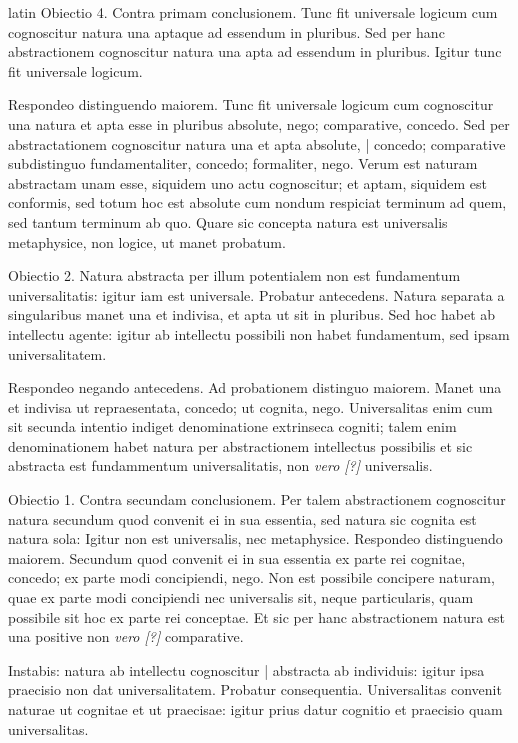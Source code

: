 \begin{otherlanguage*}{latin}
\pstart
  Obiectio 4. Contra primam conclusionem. Tunc fit universale logicum cum cognoscitur natura una aptaque ad essendum in pluribus. Sed per hanc abstractionem cognoscitur natura una apta ad essendum in pluribus. Igitur tunc fit universale logicum. 
\pend

\pstart
  Respondeo distinguendo maiorem. Tunc fit universale logicum cum cognoscitur una natura et apta esse in pluribus absolute, nego; comparative, concedo. Sed per abstractationem cognoscitur natura una et apta absolute, \textnormal{|} concedo; comparative subdistinguo fundamentaliter, concedo; formaliter, nego. Verum est naturam abstractam unam esse, siquidem uno actu cognoscitur; et aptam, siquidem est conformis, sed totum hoc est absolute cum nondum respiciat terminum ad quem, sed tantum terminum ab quo. Quare sic concepta natura est universalis metaphysice, non logice, ut manet probatum. 
\pend

\pstart
  Obiectio 2. Natura abstracta per illum potentialem non est fundamentum universalitatis: igitur iam est universale. Probatur antecedens. Natura separata a singularibus manet una et indivisa, et apta ut sit in pluribus. Sed hoc habet ab intellectu agente: igitur ab intellectu possibili non habet fundamentum, sed ipsam universalitatem. 
\pend

\pstart
  Respondeo negando antecedens. Ad probationem distinguo maiorem. Manet una et indivisa ut repraesentata, concedo; ut cognita, nego. Universalitas enim cum sit secunda intentio indiget denominatione extrinseca cogniti; talem enim denominationem habet natura per abstractionem intellectus possibilis et sic abstracta est fundammentum universalitatis, non \emph{vero [?]} universalis. 
\pend

\pstart
  Obiectio 1. Contra secundam conclusionem. Per talem abstractionem cognoscitur natura secundum quod convenit ei in sua essentia, sed natura sic cognita est natura sola: Igitur non est universalis, nec metaphysice. Respondeo distinguendo maiorem. Secundum quod convenit ei in sua essentia ex parte rei cognitae, concedo; ex parte modi concipiendi, nego. Non est possibile concipere naturam, quae ex parte modi concipiendi nec universalis sit, neque particularis, quam possibile sit hoc ex parte rei conceptae. Et sic per hanc abstractionem natura est una positive non \emph{vero [?]} comparative. 
\pend

\pstart
  Instabis: natura ab intellectu cognoscitur \textnormal{|}   abstracta ab individuis: igitur ipsa praecisio non dat universalitatem. Probatur consequentia. Universalitas convenit naturae ut cognitae et ut praecisae: igitur prius datur cognitio et praecisio quam universalitas. 
\pend


\end{otherlanguage*}
